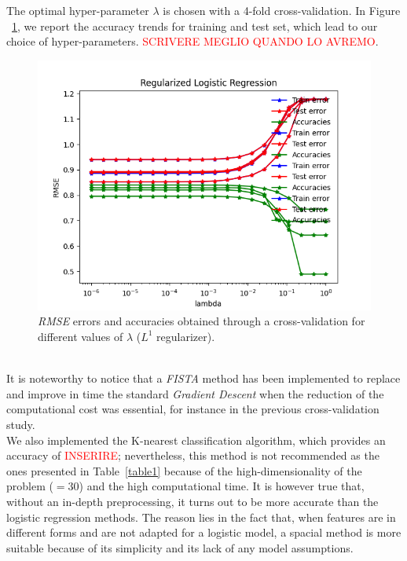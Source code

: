 \documentclass[10pt,conference,compsocconf]{IEEEtran}
\begin{document}
The optimal hyper-parameter $\lambda$ is chosen with a 4-fold cross-validation. In Figure ~\ref{reg_lambda}, we report the accuracy trends for training and test set, which lead to our choice of hyper-parameters. \textcolor{red}{SCRIVERE MEGLIO QUANDO LO AVREMO}.
\\
\begin{figure}[h] 
	\centering
		\includegraphics[scale=0.27]{../reg_logistic_regression.png} 
	\caption{\emph{RMSE} errors and accuracies obtained through a cross-validation for different values of $\lambda$ ($L^1$ regularizer).}
	\label{reg_lambda}
\end{figure}
\\
It is noteworthy to notice that a \emph{FISTA} method has been implemented to replace and improve in time the standard \emph{Gradient Descent} when the reduction of the computational cost was essential, for instance in the previous cross-validation study. 
\\
\newline
We also implemented the K-nearest classification algorithm, which provides an accuracy of \textcolor{red}{INSERIRE}; nevertheless, this method is not recommended as the ones presented in Table~\ref{table1} because of the high-dimensionality of the problem ($=30$) and the high computational time. It is however true that, without an in-depth preprocessing, it turns out to be more accurate than the logistic regression methods. The reason lies in the fact that, when features are in different forms and are not adapted for a logistic model, a spacial method is more suitable because of its simplicity and its lack of any model assumptions.
\end{document}
